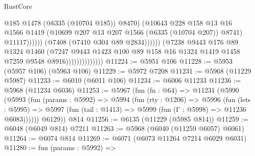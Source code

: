 \begin{lexlean}{RustCore}
\begin{coremodule}
                                                @185
                                                @1478
                                                (@6335 (@10704 @185))
                                                @8470)
                                              (@10643
                                                @228
                                                @158
                                                @13
                                                @16
                                                @1566
                                                @1419
                                                (@10699
                                                  @207
                                                  @13
                                                  @207
                                                  @1566
                                                  (@6335 (@10704 @207))
                                                  @8741)
                                                @11117))))))
                                    (@7408 (@7410 @304 @89 @2834))))))
                            (@7238
                              @9443
                              @176
                              @89
                              @1324
                              @1460
                              (@7247
                                @9443
                                @1423
                                @100
                                @89
                                @158
                                @16
                                @1324
                                @1419
                                @1458
                                @7259
                                @9548
                                @8916))))))))))))))
@11224 := @5951 @106
@11228 := @5953 (@5957 @106) (@5963 @106)
@11229 := @5972 @7208
@11231 := @5968 (@11229 @5987)
@11233 := @6010 (@6011 @106)
@11234 := @6006 @11233
@11236 := @5968 (@11234 @6036)
@11253 := @5967
    (fun (fn : @64) =>
    @11231
      (@5990
        (@5993
          (fun (params : @5992) =>
          @5994
            (fun (rty : @1206) =>
            @5996
              (fun (lets : @5995) =>
              @5997 (fun (tail : @1413) => @5999 (fun (Γ : @5998) => @11236 @6083))))))
        @6129))
    @814
@11256 := @6135 (@11229 (@5985 @814))
@11259 := @6048 (@6049 @814) @7211
@11263 := @5968 (@6040 (@11259 @6057) @6061)
@11264 := @6074 @814
@11269 := @6071 (@6073 @11264 @7214 @6029 @6031)
@11280 := fun (params : @5992) =>

\end{coremodule}
\end{lexlean}
